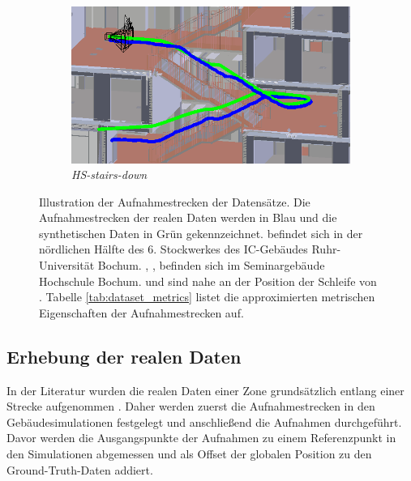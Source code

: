 \begin{figure}[H]
\begin{subfigure}[tl]{0.45\linewidth}
		\flushright		\includegraphics[width=\linewidth]{images/trajectories/hs_down.png}
		\caption{\textit{HS-stairs-down}}
		\label{subfig:traj_hs-down}
	\end{subfigure}
	\hfill
	\caption{Illustration der Aufnahmestrecken der Datensätze. Die Aufnahmestrecken der realen Daten werden in Blau und die synthetischen Daten in Grün gekennzeichnet.  befindet sich in der nördlichen Hälfte des 6. Stockwerkes des IC-Gebäudes Ruhr-Universität Bochum. , ,  befinden sich im Seminargebäude Hochschule Bochum.  und  sind nahe an der Position der Schleife von . Tabelle \ref{tab:dataset_metrics} listet die approximierten metrischen Eigenschaften der Aufnahmestrecken auf.}
	\label{fig:trajectories}
\end{figure}


\subsection{Erhebung der realen Daten}
\label{subsec:record_real_data}
In der Literatur wurden die realen Daten einer Zone grundsätzlich entlang einer Strecke aufgenommen \cite{kendallPoseNetConvolutionalNetwork2015, clarkVidLocDeepSpatioTemporal2017, acharyaBIMPoseNetIndoorCamera2019}. Daher werden zuerst die Aufnahmestrecken in den Gebäudesimulationen festgelegt und anschließend die Aufnahmen durchgeführt. Davor werden die Ausgangspunkte der Aufnahmen zu einem Referenzpunkt in den Simulationen abgemessen und als Offset der globalen Position zu den Ground-Truth-Daten addiert.

